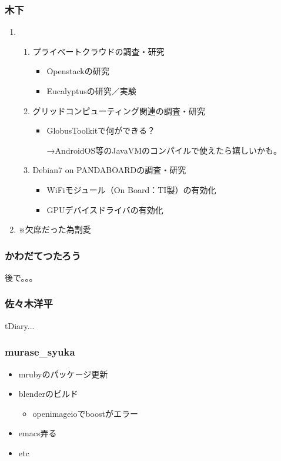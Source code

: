 \documentclass[cjk,dvipdfmx,10pt,compress,%
hyperref={bookmarks=true,bookmarksnumbered=true,bookmarksopen=false,%
colorlinks=false,%
pdftitle={第 88 回 関西 Debian 勉強会},%
pdfauthor={倉敷・のがた・佐々木・かわだ・八津尾},%
pdfsubject={資料},%
}]{beamer}
\begin{document}
\begin{frame}
  \frametitle{ 木下 }
  \begin{enumerate}
  \item
    \begin{enumerate}
    \item プライベートクラウドの調査・研究
      \begin{itemize}
      \item Openstackの研究
      \item Eucalyptusの研究／実験
      \end{itemize}
    \item グリッドコンピューティング関連の調査・研究
      \begin{itemize}
      \item GlobusToolkitで何ができる？

        →AndroidOS等のJavaVMのコンパイルで使えたら嬉しいかも。
      \end{itemize}
    \item Debian7 on PANDABOARDの調査・研究
      \begin{itemize}
      \item WiFiモジュール（On Board：TI製）の有効化
      \item GPUデバイスドライバの有効化
      \end{itemize}
    \end{enumerate}
  \item ※欠席だった為割愛
  \end{enumerate}
\end{frame}

\begin{frame}
  \frametitle{ かわだてつたろう }
後で。。。
\end{frame}

\begin{frame}
  \frametitle{ 佐々木洋平 }
tDiary...
\end{frame}

\begin{frame}
  \frametitle{ murase\_{}syuka }
  \begin{itemize}
  \item mrubyのパッケージ更新
  \item blenderのビルド
    \begin{itemize}
    \item openimageioでboostがエラー
    \end{itemize}
  \item emacs弄る
  \item etc
  \end{itemize}
\end{frame}
\end{document}
